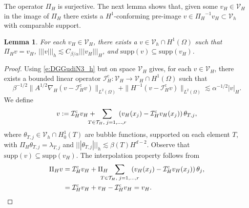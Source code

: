 \documentclass[10pt]{article}
\numberwithin{equation}{section}
\theoremstyle{plain}
\newtheorem{lemma}[theorem]{Lemma}
\theoremstyle{definition}
\theoremstyle{remark}
\begin{document}
The operator ${\Pi_H}$ is surjective. The next lemma shows that, given some $v_H\in {\mathcal{V}_H}$ in the image of ${\Pi_H}$ there exists a $H^1$-conforming pre-image $v\in {\Pi_H}^{-1}v_H\subset {\mathcal{V}_h}$ with comparable support.
\begin{lemma}\label{lem:property_Lp}
  For each $v_H\in{\mathcal{V}_H}$, there exists a $v\in {\mathcal{V}_h}\cap H^1(\Omega)$ such that ${\Pi_H} v = v_H$, ${||| {v} |||_h}\lesssim {C_{{\beta}/{\alpha}}}{||| {v_H} |||_H}$, and $\text{supp}(v)\subseteq\text{supp}(v_H)$.
\end{lemma}
\begin{proof}
Using \eqref{e:DGGudiN3_h} but on space ${\mathcal{V}_H}$ gives, for each $v\in {\mathcal{V}_H}$, there exists a bounded linear operator ${\mathcal{I}^{\operatorname*{c}}_H}:{\mathcal{V}_H}\rightarrow{\mathcal{V}_H}\cap H^1(\Omega)$ such that
\begin{equation}\label{e:DGGudiN3}
{\beta}^{-1/2}\|{A}^{1/2}\nabla_H(v-{\mathcal{I}^{\operatorname*{c}}_H} v)\|_{L^2(\Omega)} + \|H^{-1}(v-{\mathcal{I}^{\operatorname*{c}}_H} v)\|_{L^2(\Omega)}\lesssim {\alpha}^{-1/2} |v|_H.
\end{equation}
We define
  \begin{equation}\notag
    v := {\mathcal{I}^{\operatorname*{c}}_H} v_H+\hspace{-3ex}\sum_{T\in{\mathcal{T}}_H,\;j=1,\ldots,r}\hspace{-3ex}\left( v_H(x_j)-{\mathcal{I}^{\operatorname*{c}}_H} v_H(x_j) \right)\theta_{T,j},
  \end{equation}
  where $\theta_{T,j}\in {\mathcal{V}_h}\cap H^1_0(T)$ are bubble functions, supported on each element $T$, with ${\Pi_H} \theta_{T,j} = \lambda_{T,j}$ and ${||| {\theta_{T,j}} |||_h}\lesssim{\beta}(T)H^{d-2}$. Observe that $\text{supp}(v)\subseteq\text{supp}(v_H)$.  The interpolation property follows from
  \begin{equation}
    \begin{aligned}\notag
      {\Pi_H} v &= {\mathcal{I}^{\operatorname*{c}}_H} v_H+{\Pi_H}\hspace{-3ex}\sum_{T\in{\mathcal{T}}_H,\;j=1,\ldots,r}\hspace{-3ex}\left( v_H(x_j)-{\mathcal{I}^{\operatorname*{c}}_H} v_H(x_j) \right)\theta_j, \\
      & =  {\mathcal{I}^{\operatorname*{c}}_H} v_H   +  v_H -  {\mathcal{I}^{\operatorname*{c}}_H} v_H = v_H.
    \end{aligned}
  \end{equation}


\end{proof}
\end{document}
